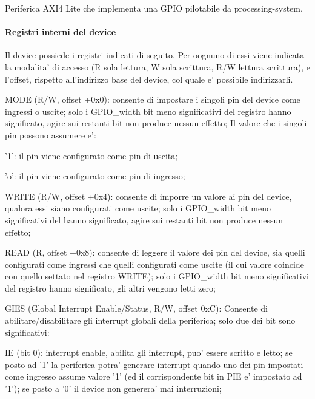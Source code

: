 Periferica A\+X\+I4 Lite che implementa una G\+P\+I\+O pilotabile da processing-\/system. \paragraph*{Registri interni del device}

Il device possiede i registri indicati di seguito. Per oognuno di essi viene indicata la modalita' di accesso (R sola lettura, W sola scrittura, R/\+W lettura scrittura), e l'offset, rispetto all'indirizzo base del device, col quale e' possibile indirizzarli.


\begin{DoxyItemize}
\item M\+O\+D\+E (R/\+W, offset +0x0)\+: consente di impostare i singoli pin del device come ingressi o uscite; solo i G\+P\+I\+O\+\_\+width bit meno significativi del registro hanno significato, agire sui restanti bit non produce nessun effetto; Il valore che i singoli pin possono assumere e'\+:
\begin{DoxyItemize}
\item '1'\+: il pin viene configurato come pin di uscita;
\item 'o'\+: il pin viene configurato come pin di ingresso;
\end{DoxyItemize}
\item W\+R\+I\+T\+E (R/\+W, offset +0x4)\+: consente di imporre un valore ai pin del device, qualora essi siano configurati come uscite; solo i G\+P\+I\+O\+\_\+width bit meno significativi del hanno significato, agire sui restanti bit non produce nessun effetto;
\item R\+E\+A\+D (R, offset +0x8)\+: consente di leggere il valore dei pin del device, sia quelli configurati come ingressi che quelli configurati come uscite (il cui valore coincide con quello settato nel registro W\+R\+I\+T\+E); solo i G\+P\+I\+O\+\_\+width bit meno significativi del registro hanno significato, gli altri vengono letti zero;
\item G\+I\+E\+S (Global Interrupt Enable/\+Status, R/\+W, offset 0x\+C)\+: Consente di abilitare/disabilitare gli interrupt globali della periferica; solo due dei bit sono significativi\+:
\begin{DoxyItemize}
\item I\+E (bit 0)\+: interrupt enable, abilita gli interrupt, puo' essere scritto e letto; se posto ad '1' la periferica potra' generare interrupt quando uno dei pin impostati come ingresso assume valore '1' (ed il corrispondente bit in P\+I\+E e' impostato ad '1'); se posto a '0' il device non generera' mai interruzioni;

\end{DoxyItemize}
\end{DoxyItemize}
